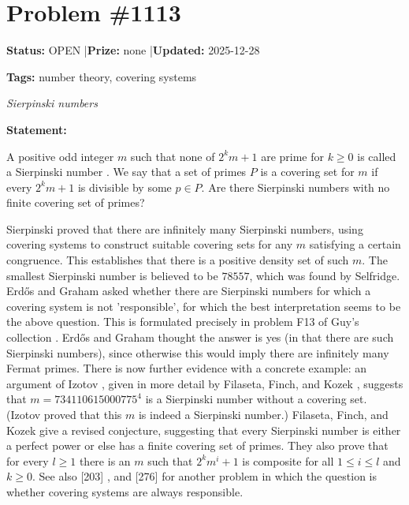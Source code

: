 \documentclass{article}
\begin{document}
\section{Problem \#1113}
\label{prob:1113}

\noindent\textbf{Status:} OPEN \quad|\quad \textbf{Prize:} none \quad|\quad \textbf{Updated:} 2025-12-28

\noindent\textbf{Tags:} number theory, covering systems

\medskip
\noindent\textit{Sierpinski numbers}


\noindent\textbf{Statement:}

A positive odd integer $m$ such that none of $2^km+1$ are prime for $k\geq 0$ is called a Sierpinski number . We say that a set of primes $P$ is a covering set for $m$ if every $2^km+1$ is divisible by some $p\in P$. Are there Sierpinski numbers with no finite covering set of primes?




Sierpinski \cite{Si60} proved that there are infinitely many Sierpinski numbers, using covering systems to construct suitable covering sets for any $m$ satisfying a certain congruence. This establishes that there is a positive density set of such $m$. The smallest Sierpinski number is believed to be $78557$, which was found by Selfridge. Erd\H{o}s and Graham \cite{ErGr80} asked whether there are Sierpinski numbers for which a covering system is not 'responsible', for which the best interpretation seems to be the above question. This is formulated precisely in problem F13 of Guy's collection \cite{Gu04}. Erd\H{o}s and Graham thought the answer is yes (in that there are such Sierpinski numbers), since otherwise this would imply there are infinitely many Fermat primes. There is now further evidence with a concrete example: an argument of Izotov \cite{Iz95}, given in more detail by Filaseta, Finch, and Kozek \cite{FFK08}, suggests that $m=734110615000775^4$ is a Sierpinski number without a covering set. (Izotov proved that this $m$ is indeed a Sierpinski number.) Filaseta, Finch, and Kozek \cite{FFK08} give a revised conjecture, suggesting that every Sierpinski number is either a perfect power or else has a finite covering set of primes. They also prove that for every $l\geq 1$ there is an $m$ such that $2^km^i+1$ is composite for all $1\leq i\leq l$ and $k\geq 0$. See also [203] , and [276] for another problem in which the question is whether covering systems are always responsible.
\end{document}
